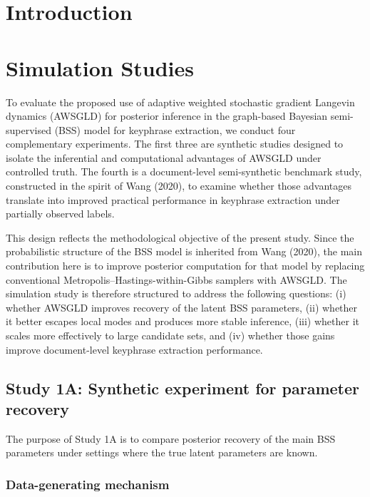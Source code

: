 \documentclass[11pt]{article}
\begin{document}
\section{Introduction}

\section{Simulation Studies}
\label{sec:simulation}

To evaluate the proposed use of adaptive weighted stochastic gradient Langevin dynamics (AWSGLD) for posterior inference in the graph-based Bayesian semi-supervised (BSS) model for keyphrase extraction, we conduct four complementary experiments. The first three are synthetic studies designed to isolate the inferential and computational advantages of AWSGLD under controlled truth. The fourth is a document-level semi-synthetic benchmark study, constructed in the spirit of Wang (2020), to examine whether those advantages translate into improved practical performance in keyphrase extraction under partially observed labels.

This design reflects the methodological objective of the present study. Since the probabilistic structure of the BSS model is inherited from Wang (2020), the main contribution here is to improve posterior computation for that model by replacing conventional Metropolis--Hastings-within-Gibbs samplers with AWSGLD. The simulation study is therefore structured to address the following questions: (i) whether AWSGLD improves recovery of the latent BSS parameters, (ii) whether it better escapes local modes and produces more stable inference, (iii) whether it scales more effectively to large candidate sets, and (iv) whether those gains improve document-level keyphrase extraction performance.

\subsection{Study 1A: Synthetic experiment for parameter recovery}
\label{subsec:sim_recovery}

The purpose of Study 1A is to compare posterior recovery of the main BSS parameters under settings where the true latent parameters are known.

\subsubsection{Data-generating mechanism}
\end{document}
